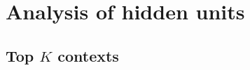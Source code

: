 \section{Analysis of hidden units}
\label{sec:micro}

%
%
%

\subsection{Top $K$ contexts}
\label{sec:reprdim}

